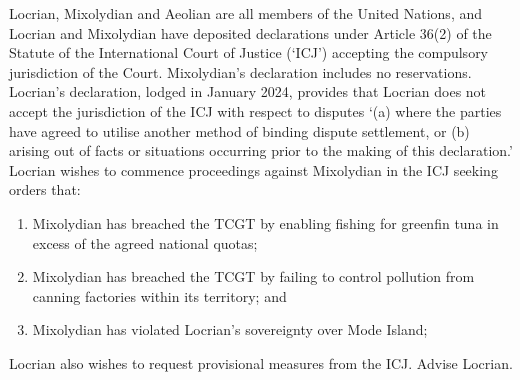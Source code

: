 \begin{tutorialquestion}
    Locrian, Mixolydian and Aeolian are all members of the United Nations, and Locrian and Mixolydian have deposited declarations under Article 36(2) of the Statute of the International Court of Justice (`ICJ') accepting the compulsory jurisdiction of the Court. Mixolydian's declaration includes no reservations. Locrian's declaration, lodged in January 2024, provides that Locrian does not accept the jurisdiction of the ICJ with respect to disputes `(a) where the parties have agreed to utilise another method of binding dispute settlement, or (b) arising out of facts or situations occurring prior to the making of this declaration.' Locrian wishes to commence proceedings against Mixolydian in the ICJ seeking orders that:

    \begin{enumerate}[label=(\alph*)]
        \item Mixolydian has breached the TCGT by enabling fishing for greenfin tuna in excess of the agreed national quotas;
        \item Mixolydian has breached the TCGT by failing to control pollution from canning factories within its territory; and
        \item Mixolydian has violated Locrian's sovereignty over Mode Island;
    \end{enumerate}

    Locrian also wishes to request provisional measures from the ICJ. Advise Locrian.
\end{tutorialquestion}